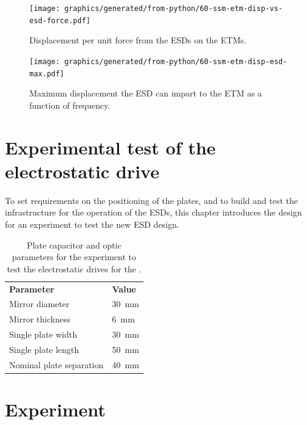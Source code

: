 \begin{figure}
  \centering
  \texttt{[image: graphics/generated/from-python/60-ssm-etm-disp-vs-esd-force.pdf]}
  \caption[Displacement per unit force from the electrostatic drives on the end test masses]{\label{fig:ssm-etm-disp-vs-esd-force}Displacement per unit force from the \glspl{ESD} on the \glspl{ETM}.}
\end{figure}

\begin{figure}
  \centering
  \texttt{[image: graphics/generated/from-python/60-ssm-etm-disp-esd-max.pdf]}
  \caption[Maximum displacement the electrostatic drive can impart to the end test mass]{\label{fig:ssm-etm-disp-esd-max}Maximum displacement the \gls{ESD} can impart to the \gls{ETM} as a function of frequency.}
\end{figure}

\section{Experimental test of the electrostatic drive}
To set requirements on the positioning of the plates, and to build and test the infrastructure for the operation of the \glspl{ESD}, this chapter introduces the design for an experiment to test the new \gls{ESD} design.

\begin{table}
  \centering
  \begin{tabular}{ll}
    \textbf{Parameter}   & \textbf{Value} \\
    Mirror diameter      & \SI{30}{\milli\meter} \\
    Mirror thickness     & \SI{6}{\milli\meter} \\
    Single plate width   & \SI{30}{\milli\meter} \\
    Single plate length  & \SI{50}{\milli\meter} \\
    Nominal plate separation & \SI{40}{\milli\meter} \\
  \end{tabular}
  \caption[Plate capacitor and optic parameters for the experiment to test the electrostatic drives for the \SSM{}]{\label{tab:esd-expt-parameters}Plate capacitor and optic parameters for the experiment to test the electrostatic drives for the \SSM{}.}
\end{table}

\section{Experiment}


